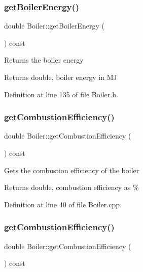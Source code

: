 \subsubsection{\texorpdfstring{get\+Boiler\+Energy()}{getBoilerEnergy()}\hspace{0.1cm}{\footnotesize\ttfamily [3/3]}}
{\footnotesize\ttfamily double Boiler\+::get\+Boiler\+Energy (\begin{DoxyParamCaption}{ }\end{DoxyParamCaption}) const\hspace{0.3cm}{\ttfamily [inline]}}

Returns the boiler energy \begin{DoxyReturn}{Returns}
double, boiler energy in MJ 
\end{DoxyReturn}


Definition at line 135 of file Boiler.\+h.

\mbox{\label{class_boiler_a21c7423b756761c3216704b3f554feff}} 
\subsubsection{\texorpdfstring{get\+Combustion\+Efficiency()}{getCombustionEfficiency()}\hspace{0.1cm}{\footnotesize\ttfamily [1/3]}}
{\footnotesize\ttfamily double Boiler\+::get\+Combustion\+Efficiency (\begin{DoxyParamCaption}{ }\end{DoxyParamCaption}) const}

Gets the combustion efficiency of the boiler \begin{DoxyReturn}{Returns}
double, combustion efficiency as \% 
\end{DoxyReturn}


Definition at line 40 of file Boiler.\+cpp.

\mbox{\label{class_boiler_a21c7423b756761c3216704b3f554feff}} 
\subsubsection{\texorpdfstring{get\+Combustion\+Efficiency()}{getCombustionEfficiency()}\hspace{0.1cm}{\footnotesize\ttfamily [2/3]}}
{\footnotesize\ttfamily double Boiler\+::get\+Combustion\+Efficiency (\begin{DoxyParamCaption}{ }\end{DoxyParamCaption}) const}

